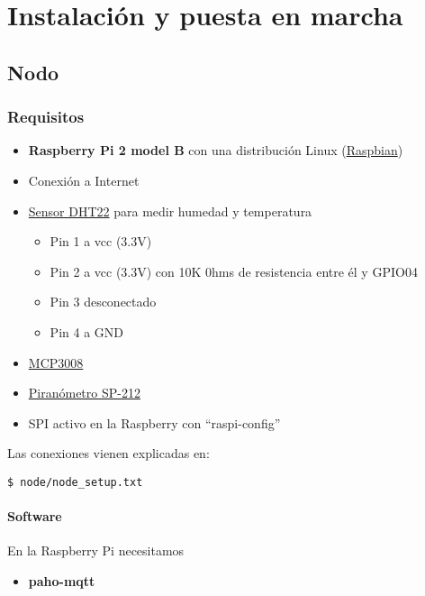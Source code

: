 \cleardoublepage

\chapter{Instalación y puesta en marcha}
\label{makereference5}

\section{Nodo}
\label{makereference5.1}
\subsection{Requisitos}
\label{makereference5.1.2}
	\begin{itemize}
		\item \textbf{Raspberry Pi 2 model B} con una distribución Linux (\href{https://www.raspberrypi.org/downloads/raspbian/}{Raspbian})
		\item Conexión a Internet
		\item \href{https://www.adafruit.com/product/385}{Sensor DHT22} para medir humedad y temperatura
			\begin{itemize}
				\item Pin 1 a vcc (3.3V)
				\item Pin 2 a vcc (3.3V) con 10K 0hms de resistencia entre él y GPIO04
				\item Pin 3 desconectado
				\item Pin 4 a GND
			\end{itemize}
		\item \href{https://www.adafruit.com/product/856}{MCP3008}
		\item \href{https://www.apogeeinstruments.co.uk/content/SP-212-215-manual.pdf}{Piranómetro SP-212}
		\item SPI activo en la Raspberry con ``raspi-config''
	\end{itemize}

Las conexiones vienen explicadas en:
\lstset{language=bash}
\begin{lstlisting}[frame=single]
$ node/node_setup.txt
\end{lstlisting}

\subsubsection{Software}
	En la Raspberry Pi necesitamos
	\begin{itemize}
		\item \textbf{paho-mqtt}
	\end{itemize}



